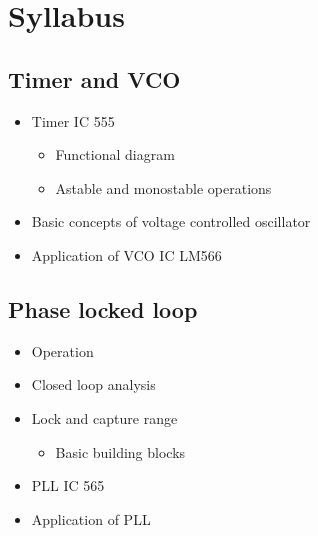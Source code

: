 \documentclass[../course]{subfiles}
\begin{document}
\section{Syllabus}

\subsection{Timer and VCO}

\begin{itemize}
    \item Timer IC 555

        \begin{itemize}
            \item Functional diagram
            \item Astable and monostable operations
        \end{itemize}

    \item Basic concepts of voltage controlled oscillator
    \item Application of VCO IC LM566
\end{itemize}

\subsection{Phase locked loop}

\begin{itemize}
    \item Operation
    \item Closed loop analysis
    \item Lock and capture range

        \begin{itemize}
            \item Basic building blocks
        \end{itemize}

    \item PLL IC 565
    \item Application of PLL
\end{itemize}
\end{document}
